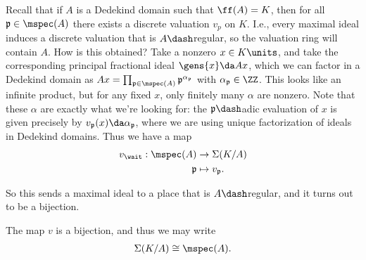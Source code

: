Recall that if \(A\) is a Dedekind domain such that \(\ff(A) = K\), then
for all \(\mathfrak{p}\in \mspec(A)\) there exists a discrete valuation
\(v_p\) on \(K\). I.e., every maximal ideal induces a discrete valuation
that is \(A\dash\)regular, so the valuation ring will contain \(A\). How
is this obtained? Take a nonzero \(x\in K\units\), and take the
corresponding principal fractional ideal \(\gens{x} \da Ax\), which we
can factor in a Dedekind domain as
\(Ax = \prod_{\mathfrak{p} \in \mspec(A)} \mathfrak{p}^{\alpha_{\mathfrak{p}}}\)
with \(\alpha_{\mathfrak{p}} \in \ZZ\). This looks like an infinite
product, but for any fixed \(x\), only finitely many \(\alpha\) are
nonzero. Note that these \(\alpha\) are exactly what we're looking for:
the \(\mathfrak{p}\dash\)adic evaluation of \(x\) is given precisely by
\(v_{\mathfrak{p}}(x) \da \alpha_{\mathfrak{p}}\), where we are using
unique factorization of ideals in Dedekind domains. Thus we have a map
\begin{align*}  
v_{\wait}: \mspec(A) &\to \Sigma(K/A) \\
\mathfrak{p} &\mapsto v_{\mathfrak{p}}
.\end{align*}

So this sends a maximal ideal to a place that is \(A\dash\)regular, and
it turns out to be a bijection.

\begin{proposition}[?]

The map \(v\) is a bijection, and thus we may write
\begin{align*}  
\Sigma(K/A) \cong \mspec(A)
.\end{align*}

\end{proposition}

